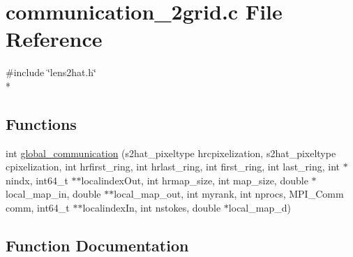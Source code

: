 \section{communication\-\_\-2grid.\-c File Reference}
\label{communication__2grid_8c}
{\ttfamily \#include \char`\"{}lens2hat.\-h\char`\"{}}\\*
\subsection*{Functions}
\begin{DoxyCompactItemize}
\item 
int \hyperlink{communication__2grid_8c_aa827d6fff40dcbb375ce17cdde06cdec}{global\-\_\-communication} (s2hat\-\_\-pixeltype hrcpixelization, s2hat\-\_\-pixeltype cpixelization, int hrfirst\-\_\-ring, int hrlast\-\_\-ring, int first\-\_\-ring, int last\-\_\-ring, int $\ast$nindx, int64\-\_\-t $\ast$$\ast$localindex\-Out, int hrmap\-\_\-size, int map\-\_\-size, double $\ast$local\-\_\-map\-\_\-in, double $\ast$$\ast$local\-\_\-map\-\_\-out, int myrank, int nprocs, M\-P\-I\-\_\-\-Comm comm, int64\-\_\-t $\ast$$\ast$localindex\-In, int nstokes, double $\ast$local\-\_\-map\-\_\-d)
\end{DoxyCompactItemize}


\subsection{Function Documentation}
